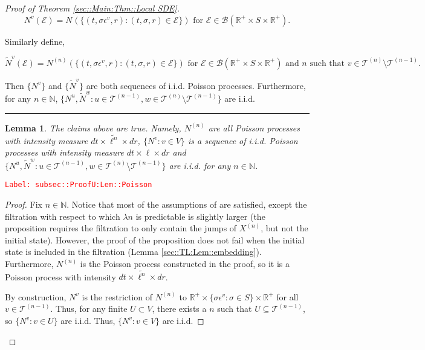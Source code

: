 \documentclass[12pt]{article}
\newcommand{\mb}{\mathbb}
\newcommand{\mc}{\mathcal}
\newcommand{\ms}{\mathscr}
\newcommand{\te}{\text}
\newcommand{\ep}{\epsilon}
\newcommand{\tr}{\textcolor{red}}
\newcommand{\labe}[1]{\tr{\texttt{Label: #1}}}
\newcommand{\ind}{\hspace{24pt}}
\newcommand{\lin}{\rule{\linewidth}{0.4 pt}}
\renewcommand{\v}{v}							%
\newcommand{\vv}{u}								%
\newcommand{\vvv}{w}							%
\renewcommand{\U}{U}							%
\renewcommand{\S}{S}							%
\newcommand{\s}{\sigma}							%
\newcommand{\ev}{\ep}							%
\renewcommand{\t}{t}							%
\newcommand{\X}{X}								%
\newcommand{\vind}[1]{^{#1}}					%
\newcommand{\cind}[1]{_{#1}}					%
\newcommand{\tip}[1]{#1}						%
\newcommand{\tree}{\mc{T}}						%
\newcommand{\sln}[1]{^{(#1)}}					%
\newcommand{\poiss}{N}							%
\newcommand{\Sm}{\ell}							%
\newcommand{\rate}{\lambda}						%
\renewcommand{\r}{r}							%
\newcommand{\alt}[1]{\widetilde{#1}}			%
\newcommand{\evnt}{\mc{E}}						%
\newtheorem{lem}[thms]{Lemma}
\begin{document}
\begin{proof}[Proof of Theorem \ref{sec::Main:Thm::Local SDE}]
\[\poiss\vind{\v}(\evnt) = \poiss\vind{}\left(\{(\t,\s\ev\vind{\v},\r):(\t,\s,\r)\in \evnt\}\right) \te{ for } \evnt \in \ms{B}(\mb{R}^+\times\S\times\mb{R}^+).\]

Similarly define,

\[\alt{\poiss}\vind{\v}(\evnt) = \poiss\sln{n}\left(\{(\t,\s\ev\vind{\v},\r):(\t,\s,\r)\in \evnt\}\right)\te{ for } \evnt \in \ms{B}(\mb{R}^+\times\S\times\mb{R}^+)\te{ and }n\te{ such that } \v\in \tree\sln{n}\setminus\tree\sln{n-1}.\]

Then \(\{\poiss\vind{\v}\}\) and \(\{\alt{\poiss}\vind{\v}\}\) are both sequences of i.i.d. Poisson processes. Furthermore, for any \(n \in \mb{N}\), \(\{\poiss\vind{\vv},\alt{\poiss}\vind{\vvv}:\vv\in \tree\sln{n-1},\vvv\in\tree\sln{n}\setminus\tree\sln{n-1}\}\) are i.i.d.

\lin

\begin{lem}
The claims above are true. Namely, \(\poiss\sln{n}\) are all Poisson processes with intensity measure \(d\t\times\alt{\Sm^{n}}\times d\r\), \(\{\poiss\vind{\v}:\v\in V\}\) is a sequence of i.i.d. Poisson processes with intensity measure \(d\t\times\Sm\times d\r\) and \(\{\poiss\vind{\vv},\alt{\poiss}\vind{\vvv}:\vv\in \tree\sln{n-1},\vvv\in\tree\sln{n}\setminus\tree\sln{n-1}\}\) are i.i.d. for any \(n \in \mb{N}\).

\label{subsec::ProofU:Lem::Poisson}
\end{lem}
\labe{subsec::ProofU:Lem::Poisson}
\begin{proof}

Fix \(n \in \mb{N}\). Notice that most of the assumptions of \cite[Proposition 14.7.I(b)]{DalVer08} are satisfied, except the filtration with respect to which \(\rate{n}\) is predictable is slightly larger (the proposition requires the filtration to only contain the jumps of \(\X\sln{n}\cind{}\tip{}\), but not the initial state). However, the proof of the proposition does not fail when the initial state is included in the filtration (Lemma \ref{sec::TL:Lem::embedding}). Furthermore, \(\poiss\sln{n}\) is the Poisson process constructed in the proof, so it is a Poisson process with intensity \(d\t\times \alt{\Sm^n}\times d\r\).

\ind By construction, \(\poiss\vind{\v}\) is the restriction of \(\poiss\sln{n}\) to \(\mb{R}^+ \times \{\s\ev\vind{\v}: \s\in \S\}\times \mb{R}^+\) for all \(\v\in \tree\sln{n-1}\). Thus, for any finite \(\U \subset V\), there exists a \(n\) such that \(\U \subseteq \tree\sln{n-1}\), so \(\{\poiss\vind{\v}: \v\in \U\}\) are i.i.d. Thus, \(\{\poiss\vind{\v}: \v\in V\}\) are i.i.d.


\end{proof}
\end{proof}
\end{document}
